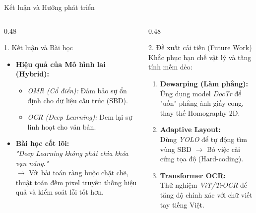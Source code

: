 \documentclass[10pt, aspectratio=169]{beamer}
\begin{document}
\begin{frame}{Kết luận và Hướng phát triển}
	
	\begin{columns}[t] %
		
		\begin{column}{0.48\textwidth}
			\begin{block}{1. Kết luận và Bài học}
				\small
				\begin{itemize}
					\setlength\itemsep{0.6em}
					\item \textbf{Hiệu quả của Mô hình lai (Hybrid):}
					\begin{itemize} \footnotesize
						\item \textit{OMR (Cổ điển):} Đảm bảo sự ổn định cho dữ liệu cấu trúc (SBD).
						\item \textit{OCR (Deep Learning):} Đem lại sự linh hoạt cho văn bản.
					\end{itemize}
					
					\item \textbf{Bài học cốt lõi:} 
					\\ \textit{"Deep Learning không phải chìa khóa vạn năng."} 
					\\ $\to$ Với bài toán ràng buộc chặt chẽ, thuật toán đếm pixel truyền thống hiệu quả và kiểm soát lỗi tốt hơn.
				\end{itemize}
			\end{block}
		\end{column}
		
		\begin{column}{0.48\textwidth}
			\begin{alertblock}{2. Đề xuất cải tiến (Future Work)}
				\small
				Khắc phục hạn chế vật lý và tăng tính mềm dẻo:
				\begin{enumerate}
					\setlength\itemsep{0.6em}
					\item \textbf{Dewarping (Làm phẳng):} 
					\\ Ứng dụng model \textit{DocTr} để "uốn" phẳng ảnh giấy cong, thay thế Homography 2D.
					
					\item \textbf{Adaptive Layout:} 
					\\ Dùng \textit{YOLO} để tự động tìm vùng SBD $\to$ Bỏ việc cài cứng tọa độ (Hard-coding).
					
					\item \textbf{Transformer OCR:} 
					\\ Thử nghiệm \textit{ViT/TrOCR} để tăng độ chính xác với chữ viết tay tiếng Việt.
				\end{enumerate}
			\end{alertblock}
		\end{column}
		
	\end{columns}
	
\end{frame}
\end{document}
